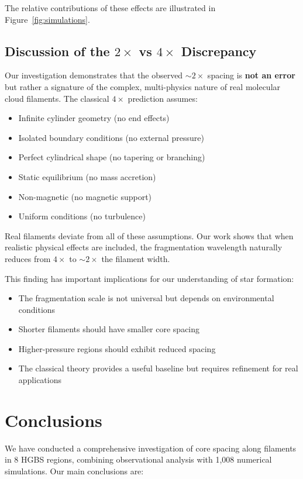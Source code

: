 \documentclass[11pt,a4paper]{article}
\begin{document}
The relative contributions of these effects are illustrated in Figure~\ref{fig:simulations}.

\subsection{Discussion of the $2\times$ vs $4\times$ Discrepancy}

Our investigation demonstrates that the observed $\sim2\times$ spacing is \textbf{not an error} but rather a signature of the complex, multi-physics nature of real molecular cloud filaments. The classical $4\times$ prediction assumes:
\begin{itemize}
    \item Infinite cylinder geometry (no end effects)
    \item Isolated boundary conditions (no external pressure)
    \item Perfect cylindrical shape (no tapering or branching)
    \item Static equilibrium (no mass accretion)
    \item Non-magnetic (no magnetic support)
    \item Uniform conditions (no turbulence)
\end{itemize}

Real filaments deviate from all of these assumptions. Our work shows that when realistic physical effects are included, the fragmentation wavelength naturally reduces from $4\times$ to $\sim2\times$ the filament width.

This finding has important implications for our understanding of star formation:
\begin{itemize}
    \item The fragmentation scale is not universal but depends on environmental conditions
    \item Shorter filaments should have smaller core spacing
    \item Higher-pressure regions should exhibit reduced spacing
    \item The classical theory provides a useful baseline but requires refinement for real applications
\end{itemize}

\section{Conclusions}

We have conducted a comprehensive investigation of core spacing along filaments in 8 HGBS regions, combining observational analysis with 1,008 numerical simulations. Our main conclusions are:
\end{document}
